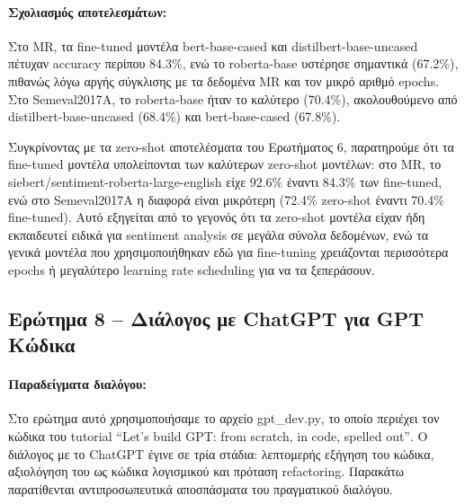 \documentclass[11pt,a4paper]{article}
\begin{document}
\paragraph{Σχολιασμός αποτελεσμάτων:}

Στο \textlatin{MR}, τα \textlatin{fine-tuned} μοντέλα \textlatin{bert-base-cased} και \textlatin{distilbert-base-uncased}
πέτυχαν \textlatin{accuracy} περίπου 84.3\%, ενώ το \textlatin{roberta-base} υστέρησε σημαντικά (67.2\%), πιθανώς
λόγω αργής σύγκλισης με τα δεδομένα \textlatin{MR} και τον μικρό αριθμό \textlatin{epochs}.
Στο \textlatin{Semeval2017A}, το \textlatin{roberta-base} ήταν το καλύτερο (70.4\%), ακολουθούμενο από
\textlatin{distilbert-base-uncased} (68.4\%) και \textlatin{bert-base-cased} (67.8\%).

Συγκρίνοντας με τα \textlatin{zero-shot} αποτελέσματα του Ερωτήματος 6, παρατηρούμε ότι τα
\textlatin{fine-tuned} μοντέλα υπολείπονται των καλύτερων \textlatin{zero-shot} μοντέλων: στο \textlatin{MR},
το \textlatin{siebert/sentiment-roberta-large-english} είχε 92.6\% έναντι 84.3\% των \textlatin{fine-tuned},
ενώ στο \textlatin{Semeval2017A} η διαφορά είναι μικρότερη (72.4\% \textlatin{zero-shot} έναντι 70.4\% \textlatin{fine-tuned}).
Αυτό εξηγείται από το γεγονός ότι τα \textlatin{zero-shot} μοντέλα είχαν ήδη εκπαιδευτεί ειδικά για \textlatin{sentiment analysis}
σε μεγάλα σύνολα δεδομένων, ενώ τα γενικά μοντέλα που χρησιμοποιήθηκαν εδώ για \textlatin{fine-tuning}
χρειάζονται περισσότερα \textlatin{epochs} ή μεγαλύτερο \textlatin{learning rate scheduling} για να τα ξεπεράσουν.

\subsection*{Ερώτημα 8 -- Διάλογος με \textlatin{ChatGPT} για \textlatin{GPT} Κώδικα}

\paragraph{Παραδείγματα διαλόγου:}

Στο ερώτημα αυτό χρησιμοποιήσαμε το αρχείο \textlatin{gpt\_dev.py}, το οποίο περιέχει τον κώδικα του tutorial
\textlatin{``Let's build GPT: from scratch, in code, spelled out''}. Ο διάλογος με το \textlatin{ChatGPT}
έγινε σε τρία στάδια: λεπτομερής εξήγηση του κώδικα, αξιολόγηση του ως κώδικα λογισμικού και πρόταση
\textlatin{refactoring}. Παρακάτω παρατίθενται αντιπροσωπευτικά αποσπάσματα του πραγματικού διαλόγου.
\end{document}
